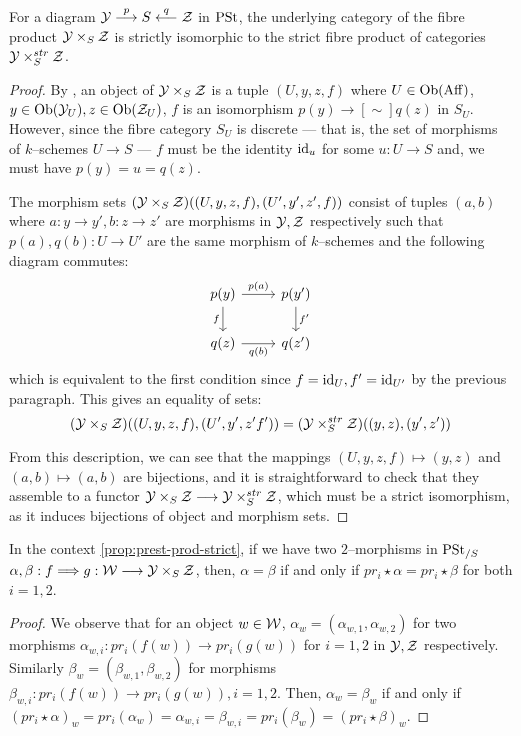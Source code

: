 \documentclass[11pt]{amsart}
\begin{document}
\begin{prop}\label{prop:prest-prod-strict}
For a diagram $\mcY \to[p] S \ot[q] \mcZ$ in $\mathrm{PSt}$,
the underlying category of the fibre product $\mathcal{Y} \times_S \mathcal{Z}$ is strictly
isomorphic to the strict fibre product of categories $\mathcal{Y} \times_S^{str} \mathcal{Z}$.
\end{prop}
\begin{proof}
By \cite[\href{https://stacks.math.columbia.edu/tag/0040}{Lemma 0040}]
{stacks-project},
an object of $\mathcal{Y} \times_S \mathcal{Z}$ is a tuple $(U, y, z, f)$ where
$U \in \Ob{\Aff}$, $y \in \Ob{\mcY_U}, z \in \Ob{\mcZ_U}$,
$f$ is an isomorphism $p(y) \to[\sim] q(z)$ in $S_U$.
However, since the fibre category $S_U$ is discrete --- that is, the set
of morphisms of $k$--schemes $U \to S$ --- $f$ must be
the identity $\mathrm{id}_u$ for some $u : U \to S$ and, we must have
$p(y) = u = q(z)$.

The morphism sets $(\mathcal{Y} \times_S \mathcal{Z})((U, y, z, f), (U', y', z', f))$
consist of tuples $(a, b)$ where $a : y \to y', b : z \to z'$ are morphisms
in $\mathcal{Y}, \mathcal{Z}$ respectively such that $p(a), q(b) : U \to U'$ are the same
morphism of $k$--schemes and the following diagram commutes:
\[\begin{tikzcd}
p(y) \ar[r, "p(a)"] \ar[d, "f" left] & p(y') \ar[d, "f'"] \\
q(z) \ar[r, "q(b)" below] & q(z')
\end{tikzcd}\]
which is equivalent to the first condition since $f = \mathrm{id}_U, f' = \mathrm{id}_{U'}$
by the previous paragraph. This gives an equality of sets:
\[
(\mathcal{Y} \times_S \mathcal{Z})((U, y, z, f), (U', y', z' f'))
= (\mathcal{Y} \times_S^{str} \mathcal{Z})((y, z), (y', z'))
\]

From this description, we can see that the mappings
$(U, y, z, f) \mapsto (y, z)$ and $(a, b) \mapsto (a, b)$ are bijections, and it is
straightforward to check that they assemble to a functor
$\mcY \times_S \mcZ \to \mcY \times_S^{str} \mcZ$, which must be
a strict isomorphism, as it induces bijections of object and morphism sets.
\end{proof}

\begin{prop}\label{prop:prest-prod-strict-nat}
In the context \cref{prop:prest-prod-strict}, if we have two $2$--morphisms in
$\mathrm{PSt}_{/S}$ $\alpha, \beta : f \To g : \mcW \to \mcY \times_S \mcZ$, then,
$\alpha = \beta$ if and only if $pr_i \star \alpha = pr_i \star \beta$ for both
$i = 1, 2$.
\end{prop}
\begin{proof}
We observe that for an object $w \in \mathcal{W}$,
$\alpha_w = (\alpha_{w, 1}, \alpha_{w, 2})$ for two morphisms
$\alpha_{w, i} : pr_i(f(w)) \to pr_i(g(w))$ for $i = 1, 2$ in $\mathcal{Y}, \mathcal{Z}$
respectively. Similarly $\beta_w = (\beta_{w, 1}, \beta_{w, 2})$
for morphisms $\beta_{w, i} : pr_i(f(w)) \to pr_i(g(w)), i = 1, 2$.
Then, $\alpha_w = \beta_w$ if and only if
$(pr_i \star \alpha)_w = pr_i(\alpha_w) = \alpha_{w, i}
= \beta_{w, i} = pr_i(\beta_w) = (pr_i \star \beta)_w$.
\end{proof}
\end{document}
